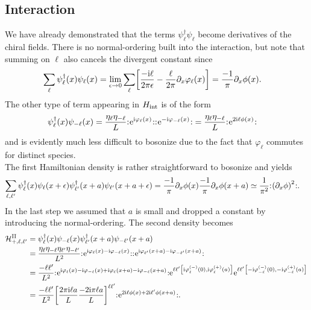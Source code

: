 \documentclass[english, parskip=full]{scrartcl}
\begin{document}
\subsection{Interaction}
We have already demonstrated that the terms $\psi_\ell^\dagger\psi_\ell$ become derivatives of the chiral fields.
There is no normal-ordering built into the interaction, but note that summing on $\ell$ also cancels the divergent constant since
\begin{align}
\sum_\ell \psi_\ell^\dagger(x) \psi_\ell(x) &= \lim_{\epsilon\rightarrow 0} \sum_\ell \klb*{\frac{-\i\ell}{2\pi\epsilon} - \frac{\ell}{2\pi}\partial_x\varphi_\ell(x)} = \frac{-1}{\pi}\partial_x\phi(x).
\end{align}
The other type of term appearing in $H_\Text{int}$ is of the form
\begin{align}
\psi_\ell^\dagger(x)\psi_{-\ell}(x) &= \frac{\eta_\ell \eta_{-\ell}}{L} \normord{\powe{\i\varphi_\ell(x)}} \normord{\powe{-\i\varphi_{-\ell}(x)}} = \frac{\eta_\ell \eta_{-\ell}}{L} \normord{\powe{2\i\ell\phi(x)}}
\end{align}
and is evidently much less difficult to bosonize due to the fact that $\varphi_\ell$ commutes for distinct species.\\
The first Hamiltonian density is rather straightforward to bosonize and yields
\begin{align}
\sum_{\ell,\ell'} \psi_{\ell}^\dagger(x) \psi_{\ell}(x+\epsilon) \psi_{\ell'}^\dagger(x+a) \psi_{\ell'}(x+a+\epsilon) &= \frac{-1}{\pi} \partial_x \phi(x) \frac{-1}{\pi} \partial_x\phi(x+a) \simeq \frac{1}{\pi^2} \normord{\kla*{\partial_x\phi}^2}.
\end{align}
In the last step we assumed that $a$ is small and dropped a constant by introducing the normal-ordering.
The second density becomes
\begin{align}
\mathcal{H}_{+,\ell,\ell'}^\Text{II} &= \psi_{\ell}^\dagger(x) \psi_{-\ell}(x) \psi_{\ell'}^\dagger(x+a) \psi_{-\ell'}(x+a)\\
&= \frac{\eta_\ell\eta_{-\ell} \eta_{\ell'}\eta_{-\ell'}}{L^2} \normord{\powe{\i\varphi_\ell(x) - \i\varphi_{-\ell}(x)}} \normord{\powe{\i\varphi_{\ell'}(x+a) - \i\varphi_{-\ell'}(x+a)}}\\
&= \frac{-\ell\ell'}{L^2} \normord{\powe{\i\varphi_\ell(x) - \i\varphi_{-\ell}(x) + \i\varphi_\ell(x+a) - \i\varphi_{-\ell}(x+a)}} \powe{\ell\ell' \klb*{\i \varphi_{\ell}^{(-)}(0), \i \varphi_{\ell}^{(+)}(a)}} \powe{\ell\ell' \klb*{-\i \varphi_{-\ell}^{(-)}(0), -\i \varphi_{-\ell}^{(+)}(a)}}\\
&= \frac{-\ell\ell'}{L^2} \klb*{\frac{2\pi\i\ell a}{L} \frac{-2\i\pi\ell a}{L}}^{\ell\ell'} \normord{\powe{2\i\ell\phi(x) + 2\i\ell'\phi(x+a)}}.
\end{align}
\end{document}
